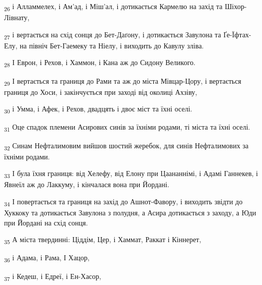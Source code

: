 \begin{tcolorbox}
\textsubscript{26} і Алламмелех, і Ам'ад, і Міш'ал, і дотикається Кармелю на захід та Шіхор-Лівнату,
\end{tcolorbox}
\begin{tcolorbox}
\textsubscript{27} і вертається на схід сонця до Бет-Даґону, і дотикається Завулона та Ґе-Їфтах-Елу, на північ Бет-Гаемеку та Ніелу, і виходить до Кавулу зліва.
\end{tcolorbox}
\begin{tcolorbox}
\textsubscript{28} І Еврон, і Рехов, і Хаммон, і Кана аж до Сидону Великого.
\end{tcolorbox}
\begin{tcolorbox}
\textsubscript{29} І вертається та границя до Рами та аж до міста Мівцар-Цору, і вертається границя до Хоси, і закінчується при заході від околиці Ахзіву,
\end{tcolorbox}
\begin{tcolorbox}
\textsubscript{30} і Умма, і Афек, і Рехов, двадцять і двоє міст та їхні оселі.
\end{tcolorbox}
\begin{tcolorbox}
\textsubscript{31} Оце спадок племени Асирових синів за їхніми родами, ті міста та їхні оселі.
\end{tcolorbox}
\begin{tcolorbox}
\textsubscript{32} Синам Нефталимовим вийшов шостий жеребок, для синів Нефталимових за їхніми родами.
\end{tcolorbox}
\begin{tcolorbox}
\textsubscript{33} І була їхня границя: від Хелефу, від Елону при Цаананнімі, і Адамі Ганнекев, і Явнеїл аж до Лаккуму, і кінчалася вона при Йордані.
\end{tcolorbox}
\begin{tcolorbox}
\textsubscript{34} І повертається та границя на захід до Ашнот-Фавору, і виходить звідти до Хуккоку та дотикається Завулона з полудня, а Асира дотикається з заходу, а Юди при Йордані на схід сонця.
\end{tcolorbox}
\begin{tcolorbox}
\textsubscript{35} А міста твердинні: Ціддім, Цер, і Хаммат, Раккат і Кіннерет,
\end{tcolorbox}
\begin{tcolorbox}
\textsubscript{36} і Адама, і Рама, І Хацор,
\end{tcolorbox}
\begin{tcolorbox}
\textsubscript{37} і Кедеш, і Едреї, і Ен-Хасор,
\end{tcolorbox}
